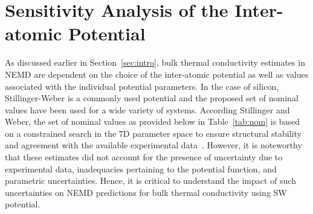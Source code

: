 \section{Sensitivity Analysis of the Inter-atomic Potential}
\label{sec:sense}

As discussed earlier in Section~\ref{sec:intro}, bulk thermal conductivity estimates in NEMD are dependent
on the choice of the inter-atomic potential as well as values associated with the individual potential parameters.
In the case of silicon, Stillinger-Weber is a commonly used potential and the proposed set of nominal values
have been used for a wide variety of systems. According Stillinger and Weber, the set of nominal values as provided
below in Table~\ref{tab:nom} is based on a constrained search in the 7D parameter space
to ensure structural stability and agreement with the available experimental data~\cite{Stillinger:1985}. However, it is
noteworthy that these estimates did not account for the presence of uncertainty due to experimental data, 
inadequacies pertaining to the potential function, and parametric uncertainties. Hence, it is critical
to understand the impact of such uncertainties on NEMD predictions for bulk thermal conductivity using
SW potential. 


